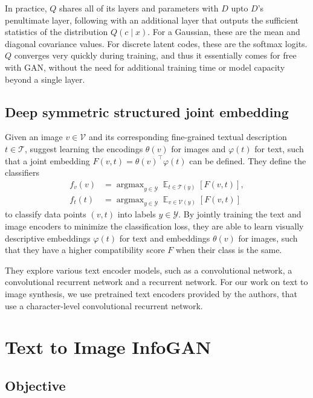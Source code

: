 \documentclass{article}
\DeclareMathOperator*{\argmax}{\arg\max}
\DeclareMathOperator*{\E}{\mathbb{E}}
\begin{document}
In practice, $Q$ shares all of its layers and parameters with $D$ upto $D$'s penultimate layer, following with an additional layer that outputs the sufficient statistics of the distribution $Q(c\mid x)$. For a Gaussian, these are the mean and diagonal covariance values. For discrete latent codes, these are the softmax logits. $Q$ converges very quickly during training, and thus it essentially comes for free with GAN, without the need for additional training time or model capacity beyond a single layer.


\subsection{Deep symmetric structured joint embedding}

Given an image $v\in\mathcal{V}$ and its corresponding fine-grained textual description $t\in\mathcal{T}$, \cite{visualdesc} suggest learning the encodings $\theta(v)$ for images and $\varphi(t)$ for text, such that a joint embedding $F(v,t)=\theta(v)^\top \varphi(t)$ can be defined. They define the classifiers
\begin{align}
f_v(v) &= \argmax_{y\in\mathcal{Y}} \E_{t\in\mathcal{T}(y)}\left[F(v,t)\right],\\
f_t(t) &= \argmax_{y\in\mathcal{Y}} \E_{v\in\mathcal{V}(y)}\left[F(v,t)\right]
\end{align}
to classify data points $(v,t)$ into labels $y\in\mathcal{Y}$. By jointly training the text and image encoders to minimize the classification loss, they are able to learn visually descriptive embeddings $\varphi(t)$ for text and embeddings $\theta(v)$ for images, such that they have a higher compatibility score $F$ when their class is the same.

They explore various text encoder models, such as a convolutional network, a convolutional recurrent network and a recurrent network. For our work on text to image synthesis, we use pretrained text encoders provided by the authors, that use a character-level convolutional recurrent network.


\section{Text to Image InfoGAN}

\subsection{Objective}
\end{document}
